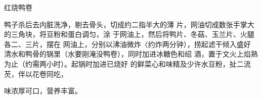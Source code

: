 \begin{recipe}{红烧鸭卷}

\ingredients







\cooking

鸭子杀后去内脏洗净，剔去骨头，切成约二指半大的薄 片，网油切成数张手掌大的三角块，将豆粉和蛋白调匀，涂 于网油上，然后将鸭片、冬菇、玉兰片、火腿各二、三片，摆在 网油上，分别以沸油微炸〈约炸两分钟），捞起滤干倾入盛好 清水和鸭骨的锅里（水要刚淹没鸭卷），同时加进冰糖色和绍 酒，置于文火上焰熟为止（约需两小时）。起锅时加进已烧好 的鲜菜心和味精及少许水豆粉，扯二流芡，伴以花卷同吃，

\notes

味浓厚可口，营养丰富。

\end{recipe}


